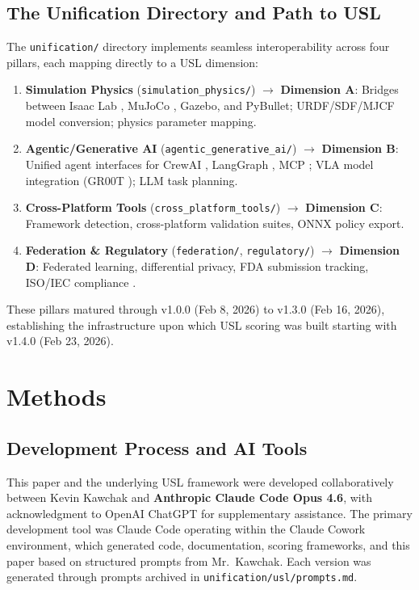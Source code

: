 \documentclass[11pt,a4paper]{article}
\begin{document}
\subsection{The Unification Directory and Path to USL}
The \texttt{unification/} directory implements seamless interoperability across four pillars, each mapping directly to a USL dimension:
\begin{enumerate}
  \item \textbf{Simulation Physics} (\texttt{simulation\_physics/}) $\rightarrow$ \textbf{Dimension A}: Bridges between Isaac Lab \cite{isaaclab2024}, MuJoCo \cite{mujoco2024}, Gazebo, and PyBullet; URDF/SDF/MJCF model conversion; physics parameter mapping.
  \item \textbf{Agentic/Generative AI} (\texttt{agentic\_generative\_ai/}) $\rightarrow$ \textbf{Dimension B}: Unified agent interfaces for CrewAI \cite{crewai2026}, LangGraph \cite{langgraph2026}, MCP \cite{mcp2025}; VLA model integration (GR00T \cite{groot2026}); LLM task planning.
  \item \textbf{Cross-Platform Tools} (\texttt{cross\_platform\_tools/}) $\rightarrow$ \textbf{Dimension C}: Framework detection, cross-platform validation suites, ONNX policy export.
  \item \textbf{Federation \& Regulatory} (\texttt{federation/}, \texttt{regulatory/}) $\rightarrow$ \textbf{Dimension D}: Federated learning, differential privacy, FDA submission tracking, ISO/IEC compliance \cite{iso13482,iec62304,iec80601}.
\end{enumerate}

These pillars matured through v1.0.0 (Feb 8, 2026) to v1.3.0 (Feb 16, 2026), establishing the infrastructure upon which USL scoring was built starting with v1.4.0 (Feb 23, 2026).

\section{Methods}
\label{sec:methods}

\subsection{Development Process and AI Tools}
This paper and the underlying USL framework were developed collaboratively between Kevin Kawchak and \textbf{Anthropic Claude Code Opus 4.6}, with acknowledgment to OpenAI ChatGPT for supplementary assistance. The primary development tool was Claude Code operating within the Claude Cowork environment, which generated code, documentation, scoring frameworks, and this paper based on structured prompts from Mr.\ Kawchak. Each version was generated through prompts archived in \texttt{unification/usl/prompts.md}.
\end{document}
